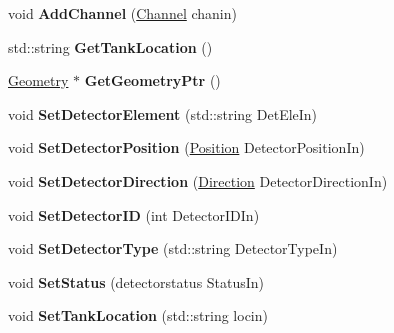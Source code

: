 \begin{DoxyCompactItemize}
\item 
\hypertarget{classDetector_adc95528c7b20269f2f30a6d5330a7fd7}{
void {\bfseries AddChannel} (\hyperlink{classChannel}{Channel} chanin)}
\label{classDetector_adc95528c7b20269f2f30a6d5330a7fd7}

\item 
\hypertarget{classDetector_aa87b945be097376ed4d9e7ad11da60f5}{
std::string {\bfseries GetTankLocation} ()}
\label{classDetector_aa87b945be097376ed4d9e7ad11da60f5}

\item 
\hypertarget{classDetector_ac0b5f82030923f555f4420c110de97b0}{
\hyperlink{classGeometry}{Geometry} $\ast$ {\bfseries GetGeometryPtr} ()}
\label{classDetector_ac0b5f82030923f555f4420c110de97b0}

\item 
\hypertarget{classDetector_a5a447c98e1cda4bcb669d6f0cf7f372e}{
void {\bfseries SetDetectorElement} (std::string DetEleIn)}
\label{classDetector_a5a447c98e1cda4bcb669d6f0cf7f372e}

\item 
\hypertarget{classDetector_a388c07e8a741d22a5dcec27ae0718223}{
void {\bfseries SetDetectorPosition} (\hyperlink{classPosition}{Position} DetectorPositionIn)}
\label{classDetector_a388c07e8a741d22a5dcec27ae0718223}

\item 
\hypertarget{classDetector_a349a08c4b6eb90415971d798f6c35466}{
void {\bfseries SetDetectorDirection} (\hyperlink{classDirection}{Direction} DetectorDirectionIn)}
\label{classDetector_a349a08c4b6eb90415971d798f6c35466}

\item 
\hypertarget{classDetector_ac6b4e26f7391b0e96cddf047aec6baf3}{
void {\bfseries SetDetectorID} (int DetectorIDIn)}
\label{classDetector_ac6b4e26f7391b0e96cddf047aec6baf3}

\item 
\hypertarget{classDetector_ac903797b8948e0107de513de60757b2e}{
void {\bfseries SetDetectorType} (std::string DetectorTypeIn)}
\label{classDetector_ac903797b8948e0107de513de60757b2e}

\item 
\hypertarget{classDetector_a912c695a5b4c7bdac1fd6d408cb4e943}{
void {\bfseries SetStatus} (detectorstatus StatusIn)}
\label{classDetector_a912c695a5b4c7bdac1fd6d408cb4e943}

\item 
\hypertarget{classDetector_acc18123ffd61248f94f86eae4a54a0af}{
void {\bfseries SetTankLocation} (std::string locin)}
\label{classDetector_acc18123ffd61248f94f86eae4a54a0af}


\end{DoxyCompactItemize}
